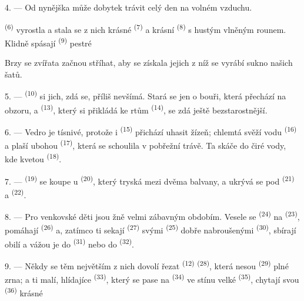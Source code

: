 4. --- Od nynějška může dobytek trávit celý den na volném vzduchu.

 \textsuperscript{(6)} vyrostla a stala se z nich krásné 
\textsuperscript{(7)} a krásní  \textsuperscript{(8)} s hustým vlněným rounem.
Klidně spásají   \textsuperscript{(9)} pestré

Brzy se  zvířata začnou stříhat, aby se získala jejich  z níž se
vyrábí sukno našich šatů.

\VUsaut{5.0mm}
\VUsaut{3.4mm}

5. ---  \textsuperscript{(10)} si jich, zdá se, příliš nevšímá. Stará se jen o
bouři, která přechází na obzoru, a  \textsuperscript{(13)}, který si
přikládá ke rtům  \textsuperscript{(14)}, se zdá ještě bezstarostnější.

6. --- Vedro je tísnivé, protože i  \textsuperscript{(15)} přichází uhasit žízeň;
chlemtá svěží vodu  \textsuperscript{(16)} a plaší ubohou
 \textsuperscript{(17)}, která se schoulila v pobřežní trávě. Ta skáče do
čiré vody, kde kvetou  \textsuperscript{(18)}.

7. ---  \textsuperscript{(19)} se koupe u 
\textsuperscript{(20)}, který tryská mezi dvěma balvany, a ukrývá se pod
 \textsuperscript{(21)} a 
\textsuperscript{(22)}.

\VUsaut{5.0mm}
\VUsaut{3.4mm}

8. --- Pro venkovské děti jsou žně velmi zábavným obdobím. Vesele se
 \textsuperscript{(24)} na 
\textsuperscript{(23)}, pomáhají  \textsuperscript{(26)} a, zatímco ti sekají
 \textsuperscript{(27)} svými  \textsuperscript{(25)} dobře
nabroušenými  \textsuperscript{(30)}, sbírají obilí a vážou je do
 \textsuperscript{(31)} nebo do
 \textsuperscript{(32)}.

9. --- Někdy se těm největším z nich dovolí řezat  \textsuperscript{(12)}
 \textsuperscript{(28)}, která nesou
 \textsuperscript{(29)} plné zrna; a ti malí, hlídajíce 
\textsuperscript{(33)}, který se pase na  \textsuperscript{(34)} ve stínu
velké  \textsuperscript{(35)}, chytají svou 
\textsuperscript{(36)} krásné 

